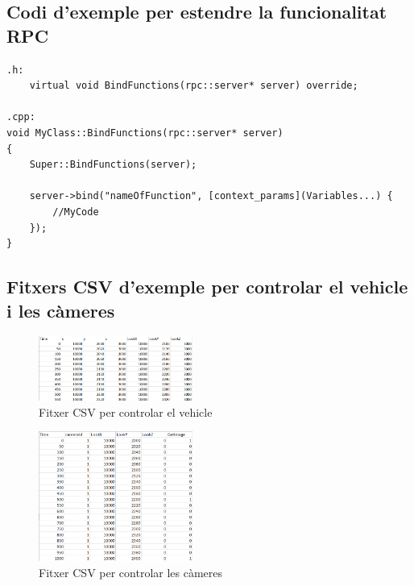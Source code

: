\documentclass[10pt,a4paper,twocolumn,twoside]{article}
\begin{document}
\subsection{Codi d'exemple per estendre la funcionalitat RPC}
\label{appendix:extendrpc}

\lstset{language=C} 
\begin{lstlisting}
.h:
	virtual void BindFunctions(rpc::server* server) override;
	
.cpp:
void MyClass::BindFunctions(rpc::server* server)
{
	Super::BindFunctions(server);

	server->bind("nameOfFunction", [context_params](Variables...) {
		//MyCode
	});
}

\end{lstlisting}

\newpage
\subsection{Fitxers CSV d'exemple per controlar el vehicle i les càmeres}
\label{appendix:fitxerscsv}

\begin{figure}[!h]
\centering
  	\includegraphics[width=0.45\textwidth]{fitxervehicle}
	\captionsetup{labelformat=empty}
	\caption{Fitxer CSV per controlar el vehicle}
	\label{fig-fitxervehicle}
\end{figure}


\begin{figure}[!h]
\centering
  	\includegraphics[width=0.45\textwidth]{fitxercameres}
  	\captionsetup{labelformat=empty}
	\caption{Fitxer CSV per controlar les càmeres}
	\label{fig-fitxercameres}
\end{figure}
\end{document}
